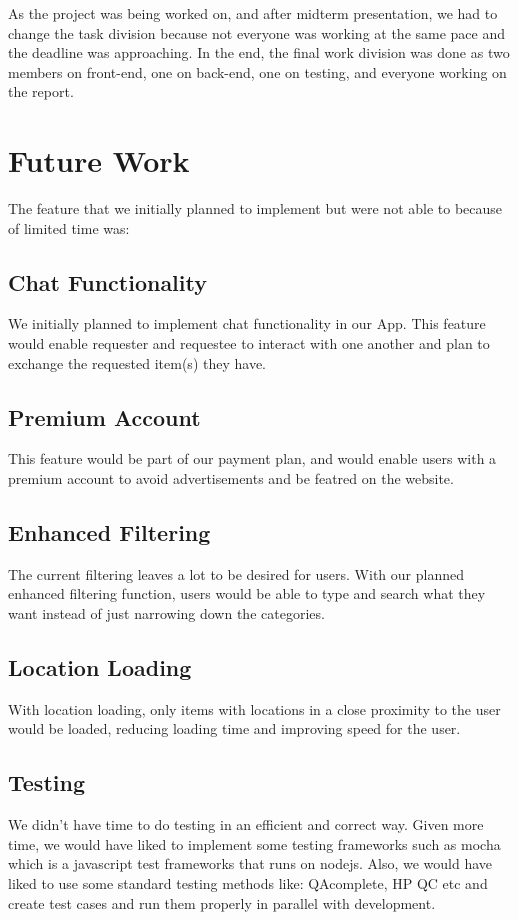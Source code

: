 \documentclass[a4paper]{article}
\begin{document}
As the project was being worked on, and after midterm presentation, we had to change the task division because not everyone was working at the same pace and the deadline was approaching. In the end, the final work division was done as two members on front-end, one on back-end, one on testing, and everyone working on the report. 

\section{Future Work}
The feature that we initially planned to implement but were not able to because of limited time was: 
\subsection{Chat Functionality} We initially planned to implement chat functionality in our App. This feature would enable requester and requestee to interact with one another and plan to exchange the requested item(s) they have.
\subsection{Premium Account}
This feature would be part of our payment plan, and would enable users with a premium account to avoid advertisements and be featred on the website.
\subsection{Enhanced Filtering}
The current filtering leaves a lot to be desired for users. With our planned enhanced filtering function, users would be able to type and search what they want instead of just narrowing down the categories.
\subsection{Location Loading}
With location loading, only items with locations in a close proximity to the user would be loaded, reducing loading time and improving speed for the user.
\subsection{Testing} We didn't have time to do testing in an efficient and correct way. Given more time, we would have liked to implement some testing frameworks such as mocha which is a javascript test frameworks that runs on nodejs. Also, we would have liked to use some standard testing methods like: QAcomplete, HP QC etc and create test cases and run them properly in parallel with development.
\end{document}
